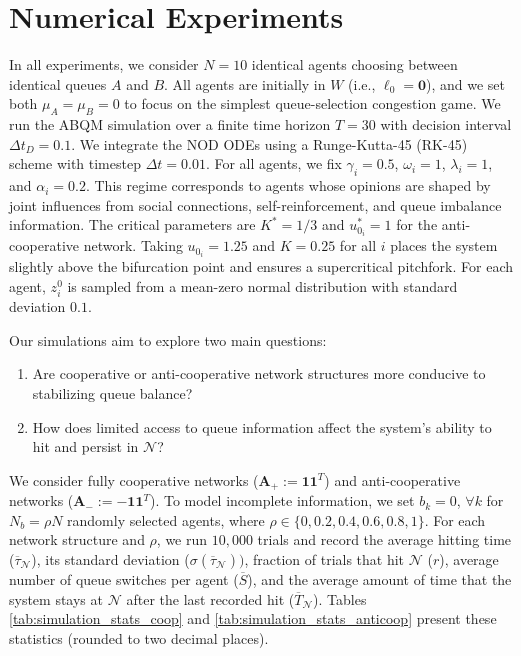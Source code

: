 \documentclass[conference]{IEEEtran}
\begin{document}
\section{Numerical Experiments}\label{sec:numerical_sims}
In all experiments, we consider $N = 10$ identical agents choosing between identical queues $A$ and $B$. All agents are initially in $W$ (i.e., $\boldsymbol{\ell}_0 = \boldsymbol{0}$), and we set both $\mu_A = \mu_B = 0$ to focus on the simplest queue-selection congestion game. 
We run the ABQM simulation over a finite time horizon $T = 30$ with decision interval $\Delta t_D = 0.1$.
We integrate the NOD ODEs using a Runge-Kutta-45 (RK-45) scheme with timestep $\Delta t = 0.01$.
For all agents, we fix $\gamma_i = 0.5$, $\omega_i = 1$, $\lambda_i = 1$, and $\alpha_i = 0.2$. 
This regime corresponds to agents whose opinions are shaped by joint influences from social connections, self-reinforcement, and queue imbalance information.
The critical parameters are $K^* = 1/3$ and
$u^*_{0_i} = 1$ for the anti-cooperative network. 
Taking $u_{0_i} = 1.25$ and $K = 0.25$ for all $i$ places the system slightly above the bifurcation point and ensures a supercritical pitchfork. 
For each agent, $z^0_i$ is sampled from a mean-zero normal distribution with standard deviation $0.1$. 

Our simulations aim to explore two main questions:
\begin{enumerate}
    \item Are cooperative or anti-cooperative network structures more conducive to stabilizing queue balance?
    \item How does limited access to queue information affect the system's ability to hit and persist in $\mathcal{N}$?
\end{enumerate}
We consider fully cooperative networks ($\boldsymbol{A}_+ := \boldsymbol{1}\boldsymbol{1}^T$) and anti-cooperative networks ($\boldsymbol{A}_- := -\boldsymbol{1}\boldsymbol{1}^T$). 
To model incomplete information, we set $b_k = 0$, $\forall k$ for $N_b = \rho N$ randomly selected agents, where $\rho \in \{0, 0.2, 0.4, 0.6, 0.8, 1\}$. 
For each network structure and $\rho$, we run $10,000$ trials and record the average hitting time ($\overline{\tau}_{\mathcal{N}}$), its standard deviation ($\sigma(\overline{\tau}_{\mathcal{N}}))$, fraction of trials that hit $\mathcal{N}$ ($r$), average number of queue switches per agent ($\overline{S}$), and the average amount of time that the system stays at $\mathcal{N}$ after the last recorded hit ($\overline{T}_{\mathcal{N}}$). 
Tables \ref{tab:simulation_stats_coop} and \ref{tab:simulation_stats_anticoop} present these statistics (rounded to two decimal places).
\end{document}
